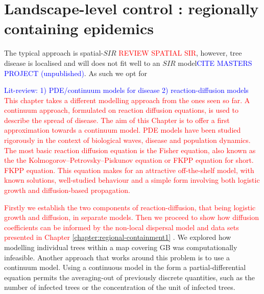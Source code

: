 
\chapter{Landscape-level control : regionally containing epidemics}
\label{ch7:pde}
The typical approach is spatial-$SIR$ \textcolor{red}{REVIEW SPATIAL SIR}, however, tree disease is localised and will does not fit well to an $SIR$ model\textcolor{blue}{CITE MASTERS PROJECT (unpublished)}. %
As such we opt for 

\textcolor{blue}{Lit-review: 1) PDE/continuum models for disease 2) reaction-diffusion models}
\textcolor{red}{This chapter takes a different modelling approach from the ones seen so far. %
A continuum approach, formulated on reaction diffusion equations, is used to describe the spread of disease. %
The aim of this Chapter is to offer a first approximation towards a continuum model. %
PDE models have been  studied rigorously in the context of biological waves, disease and population dynamics. %
The most basic reaction diffusion equation is the Fisher equation, also known as the the Kolmogorov–Petrovsky–Piskunov equation or FKPP equation for short. %
FKPP equation. This equation makes for an attractive off-the-shelf model, with known solutions, well-studied behaviour and a simple form involving both logistic growth and diffusion-based propagation.}                                                


\textcolor{red}{Firstly we establish the two components of reaction-diffusion, that being logistic growth and diffusion, in separate models. Then we proceed to show how diffusion coefficients can be informed by the non-local dispersal model and data sets presented in Chapter \ref{chapter:regional-containment1} }. We explored how modelling individual trees within a map covering GB  was computationally infeasible. Another approach that works around this problem is to use a continuum model. Using a continuous model in the form a partial-differential equation permits the averaging-out of previously discrete quantities, such as the number of infected trees or the concentration of the unit of infected  trees.

